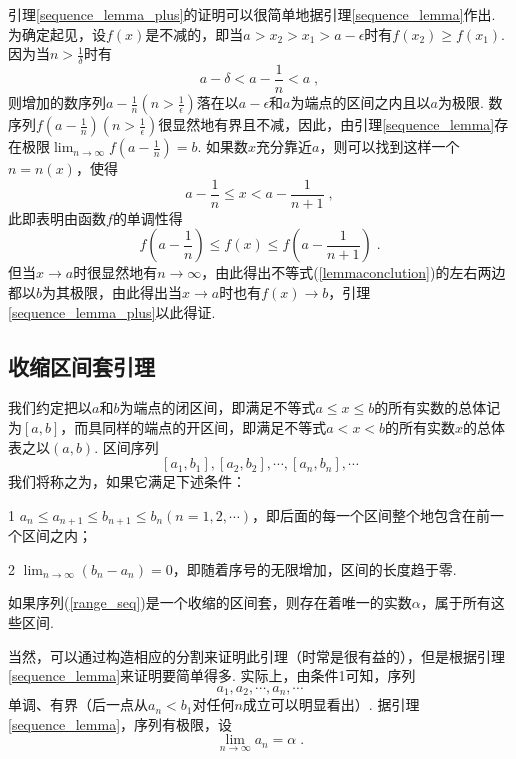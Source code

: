 \documentclass[color=cyan,mathpazo,titlestyle=hang]{elegantbook_mac}
\begin{document}
引理\ref{sequence_lemma_plus}的证明可以很简单地据引理\ref{sequence_lemma}作出. 为确定起见，设$f(x)$是不减的，即当$a>x_2>x_1>a-\epsilon$时有$f(x_2)\geqslant f(x_1)$. 因为当$n>\frac{1}{\delta}$时有
$$a-\delta<a-\frac{1}{n}<a\; ,$$
则增加的数序列$a-\frac{1}{n}(n>\frac{1}{\epsilon})$落在以$a-\epsilon$和$a$为端点的区间之内且以$a$为极限. 数序列$f(a-\frac{1}{n})(n>\frac{1}{\epsilon})$很显然地有界且不减，因此，由引理\ref{sequence_lemma}存在极限$\lim_{n\to \infty}f(a-\frac{1}{n})=b$. 如果数$x$充分靠近$a$，则可以找到这样一个$n=n(x)$，使得
$$
	a-\frac{1}{n}\leqslant x < a - \frac{1}{n+1}\; ,
$$
此即表明由函数$f$的单调性得
\begin{equation}\label{lemmaconclution}
	f(a-\frac{1}{n})\leqslant f(x) \leqslant f(a-\frac{1}{n+1})\; .
\end{equation}
但当$x\to a$时很显然地有$n\to \infty$，由此得出不等式(\ref{lemmaconclution})的左右两边都以$b$为其极限，由此得出当$x\to a$时也有$f(x)\to b$，引理\ref{sequence_lemma_plus}以此得证. 

\subsection{收缩区间套引理}

我们约定把以$a$和$b$为端点的闭区间，即满足不等式$a\leqslant x\leqslant b$的所有实数的总体记为$[a,b]$，而具同样的端点的开区间，即满足不等式$a<x<b$的所有实数$x$的总体表之以$(a,b)$. 区间序列
\begin{equation}\label{range_seq}
	[a_1,b_1],[a_2,b_2],\cdots,[a_n,b_n],\cdots
\end{equation}
我们将称之为，如果它满足下述条件：

1\textdegree \; $a_n\leqslant a_{n+1}\leqslant b_{n+1}\leqslant b_n (n=1,2,\cdots)$，即后面的每一个区间整个地包含在前一个区间之内；

2\textdegree \; $\lim_{n\to \infty}(b_n-a_n)=0$，即随着序号的无限增加，区间的长度趋于零. 

\begin{newlemma}\label{range_lemma}
	如果序列(\ref{range_seq})是一个收缩的区间套，则存在着唯一的实数$\alpha$，属于所有这些区间. 
\end{newlemma}

当然，可以通过构造相应的分割来证明此引理（时常是很有益的），但是根据引理\ref{sequence_lemma}来证明要简单得多. 实际上，由条件1\textdegree 可知，序列
$$
a_1,a_2,\cdots,a_n,\cdots
$$
单调、有界（后一点从$a_n<b_1$对任何$n$成立可以明显看出）. 据引理\ref{sequence_lemma}，序列有极限，设
$$
\lim_{n\to \infty}a_n=\alpha \; .
$$
\end{document}
